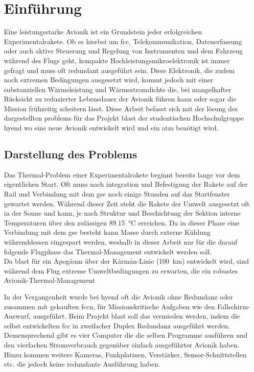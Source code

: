 \chapter{Einführung}			
\label{sec:Introduction}


Eine leistungsstarke Avionik ist ein Grundstein jeder erfolgreichen Experimentalrakete. Ob es hierbei um \ac{fcc},
Telekommunikation, Datenerfassung oder auch aktive Steuerung und Regelung von
Instrumenten und dem Fahrzeug während des Flugs geht, kompakte Hochleistungsmikroelektronik ist immer gefragt und muss oft redundant ausgeführt sein.
Diese Elektronik, die zudem noch extremen Bedingungen ausgesetzt wird, kommt jedoch mit einer
substanziellen Wärmeleistung und Wärmestromdichte die, bei mangelhafter Rücksicht zu reduzierter Lebensdauer der Avionik führen
kann oder sogar die Mission frühzeitig scheitern lässt.
Diese Arbeit befasst sich mit der lösung des dargestellten problems für das Projekt \ac{blast} der studentischen Hochschulgruppe \ac{hyend}
wo eine neue Avionik entwickelt wird und ein \ac{atm} benötigt wird.\\

\section{Darstellung des Problems}

Das Thermal-Problem einer Experimentalrakete beginnt bereits lange vor dem eigentlichen Start. Oft muss nach integration und
Befestigung der Rakete auf der Rail und Verbindung mit dem \ac{gse} noch einige Stunden auf das Startfenster gewartet werden.
Während dieser Zeit steht die Rakete der Umwelt ausgesetzt oft in der Sonne und kann, je nach Struktur und Beschichtung der Sektion 
interne Temperaturen über den zulässigen \SI{89.15}{\degreeCelsius} erreichen. Da in dieser Phase eine Verbindung mit dem 
\ac{gse} besteht kann Masse durch externe Kühlung währenddessen eingespart werden, weshalb in dieser Arbeit nur für die darauf folgende 
Flugphase das Thermal-Management entwickelt werden soll.\\
Da \ac{blast} für ein Apogäum über der Kármán-Linie (\SI{100}{\kilo\meter}) entwickelt wird, sind während dem Flug extreme Umweltbedingungen
zu erwarten, die ein robustes Avionik-Thermal-Management

In der Vergangenheit wurde bei \ac{hyend} oft die Avionik ohne Redundanz oder zusammen mit gekauften \ac{fcc}n, für 
Missionskritische Aufgaben wie den Fallschirm-Auswurf, ausgeführt. Beim Projekt \ac{blast} soll das vermieden werden, 
indem die selbst entwickelten \ac{fcc} in zweifacher Duplex Redundanz ausgeführt werden. Demensprechend gibt es vier Computer die
die selben Programme ausführen und den vierfachen Stromverbrauch gegenüber einfach ausgeführter Avionik haben. Hinzu kommen
weitere Kameras, Funkplatinen, Verstärker, Sensor-Schnittstellen etc. die jedoch keine redundante Ausführung haben.\\

